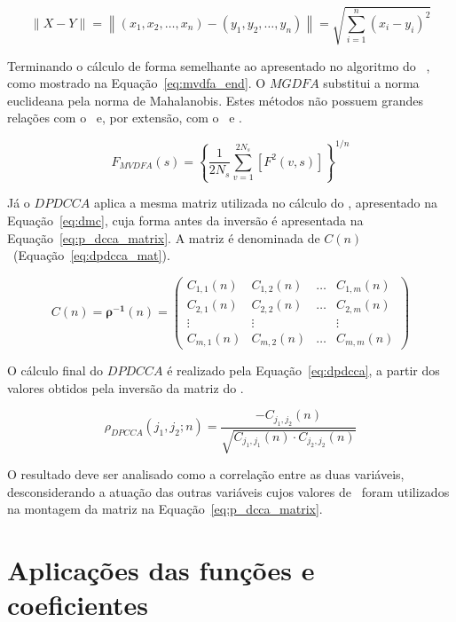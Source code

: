 \begin{equation}\label{eq:euclidean_norm}
    \|X-Y\|=\left\|\left(x_1, x_2, \ldots, x_n\right)-\left(y_1, y_2, \ldots, y_n\right)\right\|=\sqrt{\sum_{i=1}^n\left(x_i-y_i\right)^2}
\end{equation}

Terminando o cálculo de forma semelhante ao apresentado no algoritmo do \dfa~, como mostrado na Equação~\ref{eq:mvdfa_end}. O $MGDFA$ substitui a norma euclideana pela norma de Mahalanobis. Estes métodos não possuem grandes relações com o \dcca~e, por extensão, com o \pdcca~e \dmc.

\begin{equation}\label{eq:mvdfa_end}
    F_{M V D F A}(s)=\left\{\frac{1}{2 N_s} \sum_{v=1}^{2 N_s}\left[F^2(v, s)\right]\right\}^{1 / n}
\end{equation}

Já o $DPDCCA$ aplica a mesma matriz utilizada no cálculo do \dmc, apresentado na Equação~\ref{eq:dmc}, cuja forma antes da inversão é apresentada na Equação~\ref{eq:p_dcca_matrix}. A matriz é denominada de $C(n)$~(Equação~\ref{eq:dpdcca_mat}). 


\begin{equation}\label{eq:dpdcca_mat}
  C(n)=\boldsymbol{\rho}^{-\mathbf{1}}(n)=\left(\begin{matrix}
  C_{1,1}(n) & C_{1,2}(n) & \ldots & 
  C_{1, m}(n) \\
  C_{2,1}(n) & C_{2,2}(n) & \ldots & C_{2, m}(n) \\
  \vdots & \vdots & & \vdots \\
  C_{m, 1}(n) & C_{m, 2}(n) & \ldots & C_{m, m}(n)
  \end{matrix}\right)
\end{equation}

O cálculo final do $DPDCCA$ é realizado pela Equação~\ref{eq:dpdcca}, a partir dos valores obtidos pela inversão da matriz do \pdcca.

\begin{equation}\label{eq:dpdcca}
  \rho_{D P C C A}\left(j_1, j_2 ; n\right)=\frac{-C_{j_1, j_2}(n)}{\sqrt{C_{j_1, j_1}(n) \cdot C_{j_2, j_2}(n)}}
\end{equation}

O resultado deve ser analisado como a correlação entre as duas variáveis, desconsiderando a atuação das outras variáveis cujos valores de \pdcca~foram utilizados na montagem da matriz na Equação~\ref{eq:p_dcca_matrix}.

\section{Aplicações das funções e coeficientes}
\label{ss:aplica}

